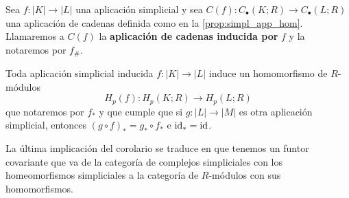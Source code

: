 \begin{definicion}
	\label{def:chain-map-ind} Sea $f : |K| \to |L|$ una aplicación simplicial y sea
	$C(f): C_{\bullet}(K;R) \to C_{\bullet}(L;R)$ una aplicación de cadenas definida
	como en la \autoref{prop:simpl_app_hom}. Llamaremos a $C(f)$ la \textbf{aplicación
		de cadenas inducida por} $f$ y la notaremos por $f_{\#}$.
\end{definicion}

\begin{corolario}
	Toda aplicación simplicial inducida $f: |K| \to |L|$ induce un homomorfismo de
	$R$-módulos
	\[
	H_{p}(f) : H_{p}(K;R) \to H_{p}(L;R)
	\]
	que notaremos por $f_{*}$ y que cumple que si $g: |L| \to |M|$ es otra aplicación
	simplicial, entonces $(g \circ f)_{*}= g_{*}\circ f_{*}$ e $\operatorname{id}_{*}= \operatorname{id}$.
\end{corolario}
\begin{observacion}
	La última implicación del corolario se traduce en que tenemos un funtor covariante
	que va de la categoría de complejos simpliciales con los homeomorfismos simpliciales
	a la categoría de $R$-módulos con sus homomorfismos.
\end{observacion}

